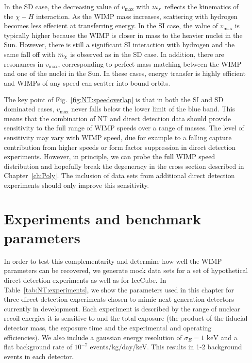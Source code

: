 In the SD case, the decreasing value of $v_\textrm{max}$ with $\mchi$ reflects the kinematics of the $\chi-H$ interaction. As the WIMP mass increases, scattering with hydrogen becomes less effecient at transferring energy. In the SI case, the value of $v_\textrm{max}$ is typically higher because the WIMP is closer in mass to the heavier nuclei in the Sun. However, there is still a significant SI interaction with hydrogen and the same fall off with $\mchi$ is observed as in the SD case. In addition, there are resonances in $v_\textrm{max}$, corresponding to perfect mass matching between the WIMP and one of the nuclei in the Sun. In these cases, energy transfer is highly efficient and WIMPs of any speed can scatter into bound orbits.

The key point of Fig.~\ref{fig:NT:speedoverlap} is that in both the SI and SD dominated cases, $v_\textrm{max}$ never falls below the lower limit of the blue band. This means that the combination of NT and direct detection data should provide sensitivity to the full range of WIMP speeds over a range of masses. The level of sensitivity may vary with WIMP speed, due for example to a falling capture contribution from higher speeds or form factor suppression in direct detection experiments. However, in principle, we can probe the full WIMP speed distribution and hopefully break the degeneracy in the cross section described in Chapter~\ref{ch:Poly}. The inclusion of data sets from additional direct detection experiments should only improve this sensitivity.




\section{Experiments and benchmark parameters}
\label{sec:NT:experiments}
In order to test this complementarity and determine how well the WIMP parameters can be recovered, we generate mock data sets for a set of hypothetical direct detection experiments as well as for IceCube. In Table~\ref{tab:NT:experiments}, we show the parameters used in this chapter for three direct detection experiments chosen to mimic next-generation detectors currently in development. Each experiment is described by the range of nuclear recoil energies it is sensitive to and the total exposure (the product of the fiducial detector mass, the exposure time and the experimental and operating efficiencies). We also include a gaussian energy resolution of $\sigma_E = 1 \textrm{ keV}$ and a flat background rate of $10^{-7}$ events/kg/day/keV. This results in 1-2 background events in each detector.

